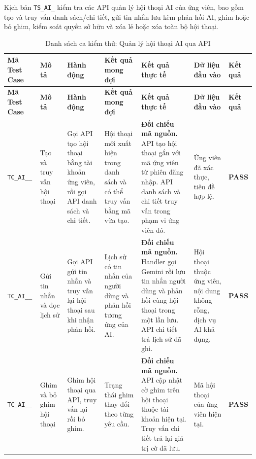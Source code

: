 \begin{landscape}
Kịch bản \texttt{TS\_\allowbreak AI\_} kiểm tra các API quản lý hội thoại AI của ứng viên, bao gồm tạo và truy vấn danh sách/chi tiết, gửi tin nhắn lưu kèm phản hồi AI, ghim hoặc bỏ ghim, kiểm soát quyền sở hữu và xóa lẻ hoặc xóa toàn bộ hội thoại.

{
\fontsize{9.5}{11.5}\selectfont
\setlength{\tabcolsep}{3pt}
\renewcommand{\arraystretch}{1.2}
\begin{longtable}{|>{\raggedright\arraybackslash}p{2.1cm}|>{\raggedright\arraybackslash}p{2.8cm}|>{\raggedright\arraybackslash}p{3.8cm}|>{\raggedright\arraybackslash}p{4.0cm}|>{\raggedright\arraybackslash}p{5.0cm}|>{\raggedright\arraybackslash}p{3.2cm}|>{\centering\arraybackslash}p{1.3cm}|}
    \caption{Danh sách ca kiểm thử: Quản lý hội thoại AI qua API} \label{tab:ts-ai-04} \\
    \hline
    \textbf{Mã Test Case} & \textbf{Mô tả} & \textbf{Hành động} & \textbf{Kết quả mong đợi} & \textbf{Kết quả thực tế} & \textbf{Dữ liệu đầu vào} & \textbf{Kết quả} \\
    \hline
    \endfirsthead
    \hline
    \textbf{Mã Test Case} & \textbf{Mô tả} & \textbf{Hành động} & \textbf{Kết quả mong đợi} & \textbf{Kết quả thực tế} & \textbf{Dữ liệu đầu vào} & \textbf{Kết quả} \\
    \hline
    \endhead
    \hline
    \endfoot
    \hline
    \endlastfoot
    \texttt{TC\_\allowbreak AI\_\allowbreak 04\_\allowbreak 01} & Tạo và truy vấn hội thoại & Gọi API tạo hội thoại bằng tài khoản ứng viên, rồi gọi API danh sách và chi tiết. & Hội thoại mới xuất hiện trong danh sách và có thể truy vấn bằng mã vừa tạo. & \textbf{Đối chiếu mã nguồn.} API tạo hội thoại gắn với mã ứng viên từ phiên đăng nhập. API danh sách và chi tiết truy vấn trong phạm vi ứng viên đó. & Ứng viên đã xác thực, tiêu đề hợp lệ. & \textbf{PASS} \\
    \hline
    \texttt{TC\_\allowbreak AI\_\allowbreak 04\_\allowbreak 02} & Gửi tin nhắn và đọc lịch sử & Gọi API gửi tin nhắn và truy vấn lại hội thoại sau khi nhận phản hồi. & Lịch sử có tin nhắn của người dùng và phản hồi tương ứng của AI. & \textbf{Đối chiếu mã nguồn.} Handler gọi Gemini rồi lưu tin nhắn người dùng và phản hồi cùng hội thoại trong một lần lưu. API chi tiết trả lịch sử đã ghi. & Hội thoại thuộc ứng viên, nội dung không rỗng, dịch vụ AI khả dụng. & \textbf{PASS} \\
    \hline
    \texttt{TC\_\allowbreak AI\_\allowbreak 04\_\allowbreak 03} & Ghim và bỏ ghim hội thoại & Ghim hội thoại qua API, truy vấn lại rồi bỏ ghim. & Trạng thái ghim thay đổi theo từng yêu cầu. & \textbf{Đối chiếu mã nguồn.} API cập nhật cờ ghim trên hội thoại thuộc tài khoản hiện tại. Truy vấn chi tiết trả lại giá trị cờ đã lưu. & Mã hội thoại của ứng viên hiện tại. & \textbf{PASS} \\

\end{longtable}}
\end{landscape}

